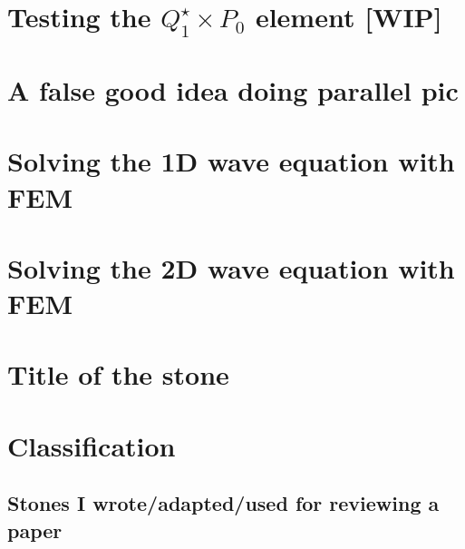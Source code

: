 \documentclass[a4paper,11pt]{report}
\begin{document}
\chapter{Testing the $Q_1^\star \times P_0$ element [WIP] \label{f162}} %

\chapter{A false good idea doing parallel pic \label{f163}} %

\chapter{Solving the 1D wave equation with FEM \label{f164}} %

\chapter{Solving the 2D wave equation with FEM \label{f165}} %



\chapter{Title of the stone}

\appendix
\chapter{Classification}

\section{
Stones I wrote/adapted/used for reviewing a paper}
\end{document}
